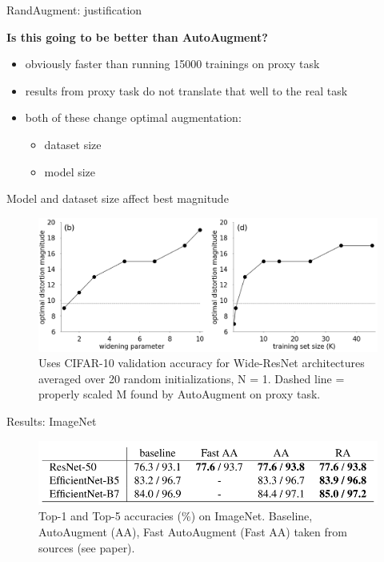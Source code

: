 \documentclass{beamer}
\begin{document}
\begin{frame}{RandAugment: justification}

\textbf{Is this going to be better than AutoAugment?}

\begin{itemize}
\item obviously faster than running 15000 trainings on proxy task
\item results from proxy task do not translate that well to the real task
\item both of these change optimal augmentation:
\begin{itemize}
\item dataset size
\item model size
\end{itemize}

\end{itemize}

\end{frame}
\begin{frame}{Model and dataset size affect best magnitude}
\begin{figure}[h]
\includegraphics[width=\textwidth]{img/proxy}
\caption{Uses CIFAR-10 validation accuracy for Wide-ResNet architectures averaged over 20 random initializations, N = 1. Dashed line = properly scaled M found by AutoAugment on proxy task.}
\end{figure}
\end{frame}
\begin{frame}{Results: ImageNet}
\begin{figure}[h]
\includegraphics[width=\textwidth]{img/imagenet}
\caption{Top-1 and Top-5 accuracies (\%) on ImageNet. Baseline,  AutoAugment (AA), Fast AutoAugment (Fast AA) taken from sources (see paper).}
\end{figure}
\end{frame}
\end{document}
